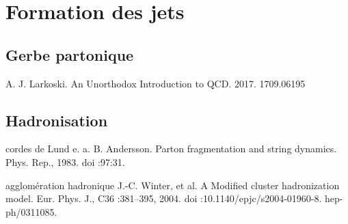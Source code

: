 \section{Formation des jets}\label{chapter-JERC-section-jets}

\subsection{Gerbe partonique}\label{chapter-JERC-section-jets-subsec-gerbe-partonique}
A. J. Larkoski. An Unorthodox Introduction to QCD. 2017.
1709.06195

\subsection{Hadronisation}\label{chapter-JERC-section-jets-subsec-hadronisation}

cordes de Lund
e. a. B. Andersson. Parton fragmentation and string dynamics. Phys. Rep., 1983.
doi :97:31.

agglomération hadronique
J.-C. Winter, et al. A Modified cluster hadronization model. Eur. Phys. J.,
C36 :381–395, 2004. doi :10.1140/epjc/s2004-01960-8. hep-ph/0311085.
